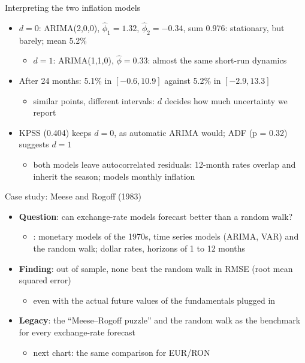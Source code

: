 \begin{frame}{Interpreting the two inflation models}
\itemsize{\small}
\begin{itemize}
    \item $d = 0$: ARIMA(2,0,0), $\hat\phi_1 = 1.32$, $\hat\phi_2 = \ensuremath{-}0.34$, sum 0.976: stationary, but barely; mean 5.2\%
    \begin{itemize}
        \item $d = 1$: ARIMA(1,1,0), $\hat\phi = 0.33$: almost the same short-run dynamics
    \end{itemize}
    \item After 24 months: 5.1\% in $[\ensuremath{-}0.6, 10.9]$ against 5.2\% in $[\ensuremath{-}2.9, 13.3]$
    \begin{itemize}
        \item similar points, different intervals: $d$ decides how much uncertainty we report
    \end{itemize}
    \item KPSS (0.404) keeps $d = 0$, as automatic ARIMA would; ADF (p = 0.32) suggests $d = 1$
    \begin{itemize}
        \item both models leave autocorrelated residuals: 12-month rates overlap and inherit the season;  models monthly inflation
    \end{itemize}
\end{itemize}
\end{frame}

\begin{frame}{Case study: Meese and Rogoff (1983)}
\itemsize{\small}
\begin{itemize}
    \item \textbf{Question}: can exchange-rate models forecast better than a random walk?
    \begin{itemize}
        \item {}: monetary models of the 1970s, time series models (ARIMA, VAR) and the random walk; dollar rates, horizons of 1 to 12 months
    \end{itemize}
    \item \textbf{Finding}: out of sample, none beat the random walk in RMSE (root mean squared error)
    \begin{itemize}
        \item even with the actual future values of the fundamentals plugged in
    \end{itemize}
    \item \textbf{Legacy}: the ``Meese--Rogoff puzzle'' and the random walk as the benchmark for every exchange-rate forecast
    \begin{itemize}
        \item next chart: the same comparison for EUR/RON
    \end{itemize}
\end{itemize}
\end{frame}

